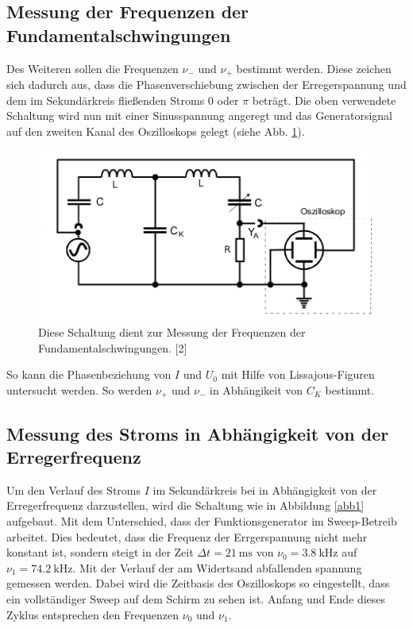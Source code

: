 \documentclass[11pt,ngerman,a4paper]{article}
\begin{document}
\subsection{Messung der Frequenzen der Fundamentalschwingungen}
Des Weiteren sollen die Frequenzen $\nu_-$ und $\nu_+$ bestimmt werden. Diese zeichen sich dadurch aus, dass die Phasenverschiebung zwischen der Erregerspannung und dem im Sekundärkreis fließenden Stroms $0$ oder $\pi$ beträgt. Die oben verwendete Schaltung wird nun mit einer Sinusspannung angeregt und das Generatorsignal auf den zweiten Kanal des Oszilloskops gelegt (siehe Abb. \ref{abb3}).
\begin{figure}[h!]
\centering
\includegraphics[scale=0.5]{Abb/abb3.png}
\caption{Diese Schaltung dient  zur Messung der Frequenzen der Fundamentalschwingungen. [2]}
\label{abb3}
\end{figure}
So kann die Phasenbeziehung von $I$ und $U_0$ mit Hilfe von Lissajous-Figuren untersucht werden. So werden $\nu_+$ und $\nu_-$ in Abhängikeit von $C_K$ bestimmt.
\subsection{Messung des Stroms in Abhängigkeit von der Erregerfrequenz}

Um den Verlauf des Stroms $I$ im Sekundärkreis bei in Abhängigkeit von der Erregerfrequenz darzustellen, wird die Schaltung wie in Abbildung \ref{abb1} aufgebaut. Mit dem Unterschied, dass der Funktionsgenerator im Sweep-Betreib arbeitet. Dies bedeutet, dass die Frequenz der Errgerspannung nicht mehr konstant ist, sondern steigt in der Zeit $\Delta t =\SI{21}{\milli\second}$ von $\nu_0 = \SI{3,8}{\kilo\hertz}$ auf $\nu_1 = \SI{74,2}{\kilo\hertz}$. Mit der Verlauf der am Widertsand abfallenden spannung gemessen werden. Dabei wird die Zeitbasis des Oszilloskops so eingestellt, dass ein vollständiger Sweep auf dem Schirm zu sehen ist. Anfang und Ende dieses Zyklus entsprechen den Frequenzen $\nu_0$ und $\nu_1$.     
\end{document}
